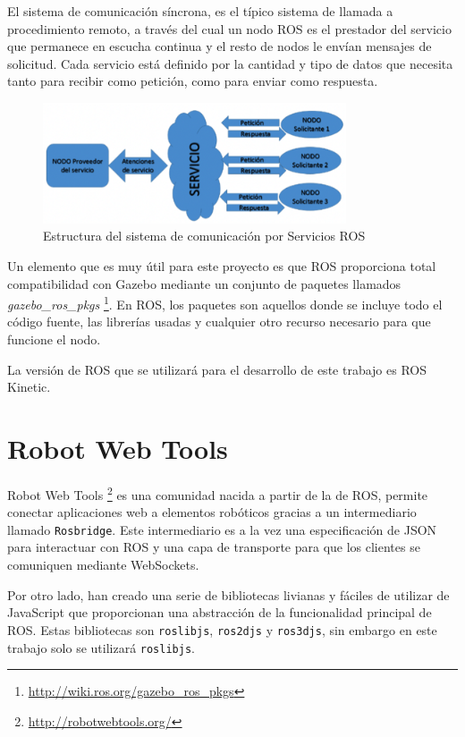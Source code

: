 El sistema de comunicación síncrona, es el típico sistema de llamada a procedimiento remoto, a través del cual un nodo ROS es el prestador del servicio que permanece en escucha continua y el resto de nodos le envían mensajes de solicitud. Cada servicio está definido por la cantidad y tipo de datos que necesita tanto para recibir como petición, como para enviar como respuesta.

\begin{figure}[H]
  \begin{center}
    \includegraphics[width=0.8\textwidth]{figures/serviciosros.png}
		\caption{Estructura del sistema de comunicación por Servicios ROS}
		\label{fig.serviciosros}
		\end{center}
\end{figure}

Un elemento que es muy útil para este proyecto es que ROS proporciona total compatibilidad con Gazebo mediante un conjunto de paquetes llamados \textit{gazebo\_ros\_pkgs} \footnote{\url{http://wiki.ros.org/gazebo_ros_pkgs}}. En ROS, los paquetes son aquellos donde se incluye todo el código fuente, las librerías usadas y cualquier otro recurso necesario para que funcione el nodo.

La versión de ROS que se utilizará para el desarrollo de este trabajo es ROS Kinetic.

\section{Robot Web Tools}
Robot Web Tools \footnote{\url{http://robotwebtools.org/}} es una comunidad nacida a partir de la de ROS, permite conectar aplicaciones web a elementos robóticos gracias a un intermediario llamado \texttt{Rosbridge}. Este intermediario es a la vez una especificación de JSON para interactuar con ROS y una capa de transporte para que los clientes se comuniquen mediante WebSockets. 

Por otro lado, han creado una serie de bibliotecas livianas y fáciles de utilizar de JavaScript que proporcionan una abstracción de la funcionalidad principal de ROS. Estas bibliotecas son \texttt{roslibjs}, \texttt{ros2djs} y \texttt{ros3djs}, sin embargo en este trabajo solo se utilizará \texttt{roslibjs}.

